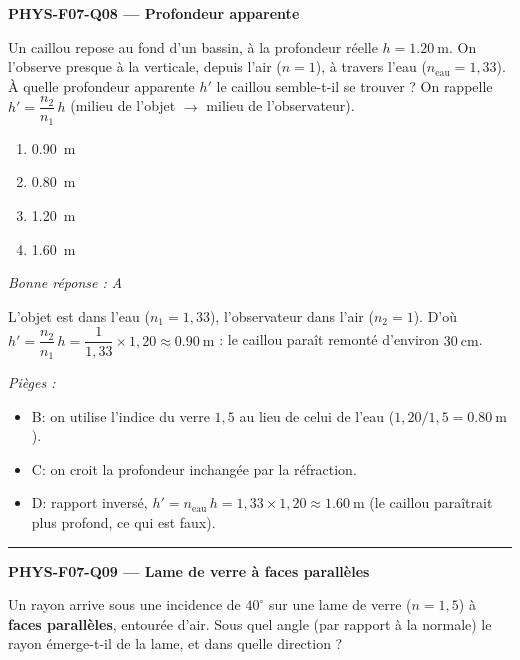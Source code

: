 \documentclass[11pt,a4paper]{article}
\begin{document}
\noindent\textbf{PHYS-F07-Q08 --- Profondeur apparente}\par
Un caillou repose au fond d'un bassin, à la profondeur réelle $h=\qty{1.20}{\metre}$. On l'observe presque à la verticale, depuis l'air ($n=1$), à travers l'eau ($n_{\text{eau}}=1{,}33$). À quelle profondeur apparente $h'$ le caillou semble-t-il se trouver ? On rappelle $h'=\dfrac{n_2}{n_1}\,h$ (milieu de l'objet $\to$ milieu de l'observateur).
\begin{enumerate}[label=\Alph*)]
\item \qty{0.90}{\metre}
\item \qty{0.80}{\metre}
\item \qty{1.20}{\metre}
\item \qty{1.60}{\metre}
\end{enumerate}
\textit{Bonne réponse : A}\par
L'objet est dans l'eau ($n_1=1{,}33$), l'observateur dans l'air ($n_2=1$). D'où $h'=\dfrac{n_2}{n_1}\,h=\dfrac{1}{1{,}33}\times 1{,}20\approx\qty{0.90}{\metre}$ : le caillou paraît remonté d'environ $\qty{30}{\centi\metre}$.\par
\textit{Pièges :}
\begin{itemize}
\item B: on utilise l'indice du verre $1{,}5$ au lieu de celui de l'eau ($1{,}20/1{,}5=\qty{0.80}{\metre}$).
\item C: on croit la profondeur inchangée par la réfraction.
\item D: rapport inversé, $h'=n_{\text{eau}}\,h=1{,}33\times1{,}20\approx\qty{1.60}{\metre}$ (le caillou paraîtrait plus profond, ce qui est faux).
\end{itemize}
\vspace{8pt}\hrule\vspace{8pt}

\noindent\textbf{PHYS-F07-Q09 --- Lame de verre à faces parallèles}\par
Un rayon arrive sous une incidence de $40^\circ$ sur une lame de verre ($n=1{,}5$) à \textbf{faces parallèles}, entourée d'air. Sous quel angle (par rapport à la normale) le rayon émerge-t-il de la lame, et dans quelle direction ?

\begin{center}
\end{center}
\end{document}
